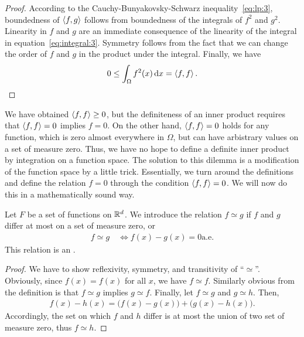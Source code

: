 \begin{proof}
  According to the Cauchy-Bunyakovsky-Schwarz
  inequality~\eqref{eq:lp:3}, boundedness of $\scal(f,g)$ follows from
  boundedness of the integrals of $f^2$ and $g^2$.
  Linearity in $f$ and $g$ are an immediate consequence of the
  linearity of the integral in
  equation~\eqref{eq:integral:3}. Symmetry follows from the fact that
  we can change the order of $f$ and $g$ in the product under the
  integral. Finally, we have
  \begin{gather*}
    0 \le \int_\Omega f^2(x)\dx = \scal(f,f).
  \end{gather*}
\end{proof}

\begin{intro}
  We have obtained $\scal(f,f) \ge 0$, but the definiteness of an
  inner product requires that $\scal(f,f) = 0$ implies $f=0$. On the
  other hand, $\scal(f,f) = 0$ holds for any function, which is zero
  almost everywhere in $\Omega$, but can have arbistrary values on a
  set of measure zero. Thus, we have no hope to define a definite
  inner product by integration on a function space. The solution to
  this dilemma is a modification of the function space by a little
  trick. Essentially, we turn around the definitions and define the
  relation $f=0$ through the condition $\scal(f,f) = 0$. We will now
  do this in a mathematically sound way.
\end{intro}

\begin{lemma}
  Let $F$ be a set of functions on $\mathbb R^d$. We introduce the relation
  $f\simeq g$ if $f$ and $g$ differ at most on a set of measure zero,
  or
  \begin{gather}
    f\simeq g
    \quad\Leftrightarrow f(x)-g(x)=0 \text{a.e.}
  \end{gather}
 This relation is an .
\end{lemma}

\begin{proof}
  We have to show reflexivity, symmetry, and transitivity of
  ``$\simeq$''. Obviously, since $f(x)=f(x)$ for all $x$, we have
  $f\simeq f$. Similarly obvious from the definition is that $f\simeq
  g$ implies $g\simeq f$. Finally, let $f\simeq g$ and $g\simeq
  h$. Then,
  \begin{gather*}
    f(x)-h(x) = \bigl(f(x)-g(x)\bigr) + \bigl(g(x)-h(x)\bigr).
  \end{gather*}
  Accordingly, the set on which $f$ and $h$ differ is at most the union of
  two set of measure zero, thus $f\simeq h$.
\end{proof}

